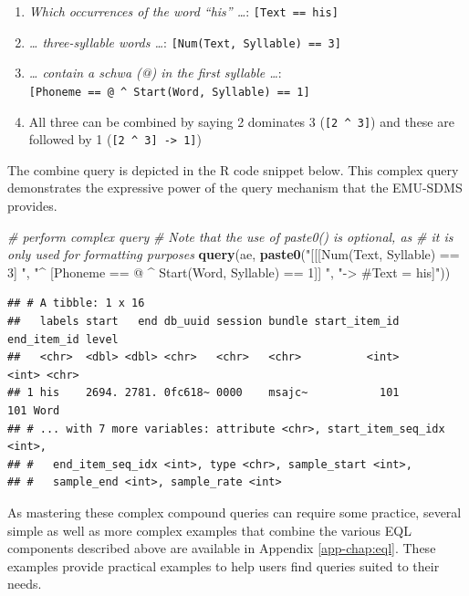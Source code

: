 \documentclass[]{book}
\newenvironment{Shaded}{\begin{snugshade}}{\end{snugshade}}
\newcommand{\CommentTok}[1]{\textcolor[rgb]{0.56,0.35,0.01}{\textit{#1}}}
\newcommand{\KeywordTok}[1]{\textcolor[rgb]{0.13,0.29,0.53}{\textbf{#1}}}
\newcommand{\NormalTok}[1]{#1}
\newcommand{\StringTok}[1]{\textcolor[rgb]{0.31,0.60,0.02}{#1}}
\providecommand{\tightlist}{%
  \setlength{\itemsep}{0pt}\setlength{\parskip}{0pt}}
\begin{document}
\begin{enumerate}
\def\labelenumi{\arabic{enumi}.}
\tightlist
\item
  \emph{Which occurrences of the word ``his'' \ldots{}}: \texttt{{[}Text\ ==\ his{]}}
\item
  \emph{\ldots{} three-syllable words \ldots{}}: \texttt{{[}Num(Text,\ Syllable)\ ==\ 3{]}}
\item
  \emph{\ldots{} contain a schwa (@) in the first syllable \ldots{}}: \texttt{{[}Phoneme\ ==\ @\ \^{}\ Start(Word,\ Syllable)\ ==\ 1{]}}
\item
  All three can be combined by saying 2 dominates 3 (\texttt{{[}2\ \^{}\ 3{]}}) and these are followed by 1 (\texttt{{[}2\ \^{}\ 3{]}\ -\textgreater{}\ 1{]}})
\end{enumerate}

The combine query is depicted in the R code snippet below. This complex query demonstrates the expressive power of the query mechanism that the EMU-SDMS provides.

\begin{Shaded}
\begin{Highlighting}[]
\CommentTok{# perform complex query}
\CommentTok{# Note that the use of paste0() is optional, as}
\CommentTok{# it is only used for formatting purposes}
\KeywordTok{query}\NormalTok{(ae, }\KeywordTok{paste0}\NormalTok{(}\StringTok{"[[[Num(Text, Syllable) == 3] "}\NormalTok{,}
                 \StringTok{"^ [Phoneme == @ ^ Start(Word, Syllable) == 1]] "}\NormalTok{,}
                 \StringTok{"-> #Text = his]"}\NormalTok{))}
\end{Highlighting}
\end{Shaded}

\begin{verbatim}
## # A tibble: 1 x 16
##   labels start   end db_uuid session bundle start_item_id end_item_id level
##   <chr>  <dbl> <dbl> <chr>   <chr>   <chr>          <int>       <int> <chr>
## 1 his    2694. 2781. 0fc618~ 0000    msajc~           101         101 Word 
## # ... with 7 more variables: attribute <chr>, start_item_seq_idx <int>,
## #   end_item_seq_idx <int>, type <chr>, sample_start <int>,
## #   sample_end <int>, sample_rate <int>
\end{verbatim}

As mastering these complex compound queries can require some practice, several simple as well as more complex examples that combine the various EQL components described above are available in Appendix \ref{app-chap:eql}. These examples provide practical examples to help users find queries suited to their needs.
\end{document}
